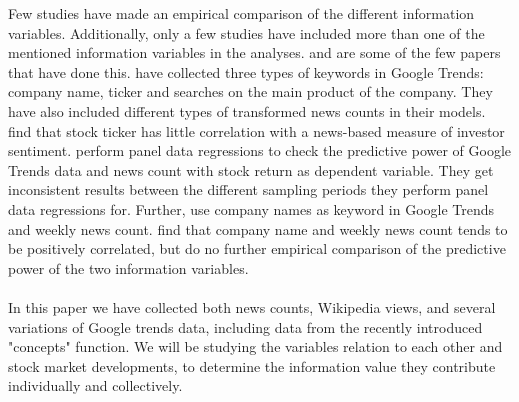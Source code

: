 Few studies have made an empirical comparison of the different information variables. Additionally, only a few studies have included more than one of the mentioned information variables in the analyses. \cite{vlastakis} and \cite{engelberg} are some of the few papers that have done this. \cite{engelberg} have collected three types of keywords in Google Trends: company name, ticker and searches on the main product of the company. They have also included different types of transformed news counts in their models. \cite{engelberg} find that stock ticker has little correlation with a news-based measure of investor sentiment. \cite{engelberg} perform panel data regressions to check the predictive power of Google Trends data and news count with stock return as dependent variable. They get inconsistent results between the different sampling periods they perform panel data regressions for. Further, \cite{vlastakis} use company names as keyword in Google Trends and weekly news count. \cite{vlastakis} find that company name and weekly news count tends to be positively correlated, but do no further empirical comparison of the predictive power of the two information variables. 
\\\\
In this paper we have collected both news counts, Wikipedia views, and several variations of Google trends data, including data from the recently introduced "concepts" function. We will be studying the variables relation to each other and stock market developments, to determine the information value they contribute individually and collectively.
\\\\

